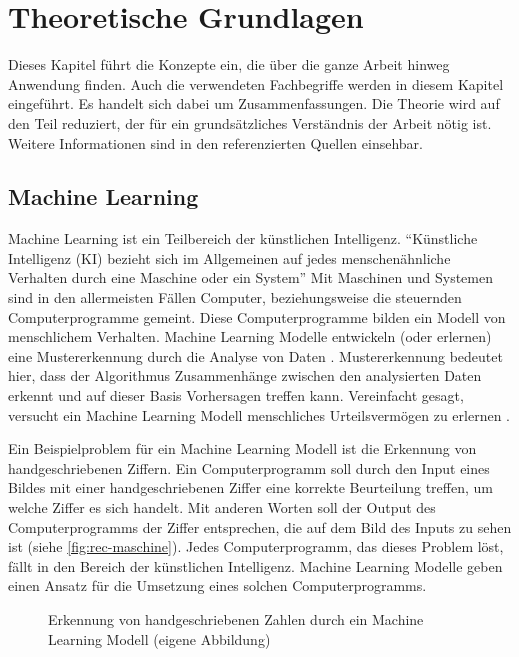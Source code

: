 \chapter{Theoretische Grundlagen}\label{chap:t}
Dieses Kapitel führt die Konzepte ein, die über die ganze Arbeit hinweg
Anwendung finden. Auch die verwendeten Fachbegriffe werden in diesem Kapitel
eingeführt. Es handelt sich dabei um Zusammenfassungen. Die Theorie wird auf den
Teil reduziert, der für ein grundsätzliches Verständnis der Arbeit nötig ist.
Weitere Informationen sind in den referenzierten Quellen einsehbar.
 
\section{Machine Learning}\label{chap:t_ml}
Machine Learning ist ein Teilbereich der künstlichen Intelligenz. ``Künstliche
Intelligenz (KI) bezieht sich im Allgemeinen auf jedes menschenähnliche
Verhalten durch eine Maschine oder ein System'' \cite{noauthor_what_nodate} Mit
Maschinen und Systemen sind in den allermeisten Fällen Computer, beziehungsweise
die steuernden Computerprogramme gemeint. Diese Computerprogramme bilden ein
Modell von menschlichem Verhalten. Machine Learning Modelle entwickeln (oder
erlernen) eine Mustererkennung durch die Analyse von Daten
\cite{noauthor_what_nodate-1}. Mustererkennung bedeutet hier, dass der
Algorithmus Zusammenhänge zwischen den analysierten Daten erkennt und auf dieser
Basis Vorhersagen treffen kann. Vereinfacht gesagt, versucht ein Machine
Learning Modell menschliches Urteilsvermögen zu erlernen
\cite{spaulding_is_2020}.
 
Ein Beispielproblem für ein Machine Learning Modell ist die Erkennung von
handgeschriebenen Ziffern. Ein Computerprogramm soll durch den Input eines
Bildes mit einer handgeschriebenen Ziffer eine korrekte Beurteilung treffen, um
welche Ziffer es sich handelt. Mit anderen Worten soll der Output des
Computerprogramms der Ziffer entsprechen, die auf dem Bild des Inputs zu sehen
ist (siehe \autoref{fig:rec-maschine}). Jedes Computerprogramm, das dieses
Problem löst, fällt in den Bereich der künstlichen Intelligenz. Machine Learning
Modelle geben einen Ansatz für die Umsetzung eines solchen Computerprogramms.
 
\begin{figure}[!ht]
   \centering
   \caption{Erkennung von handgeschriebenen Zahlen durch ein Machine Learning Modell (eigene Abbildung)}\label{fig:rec-maschine}
\end{figure}
 
